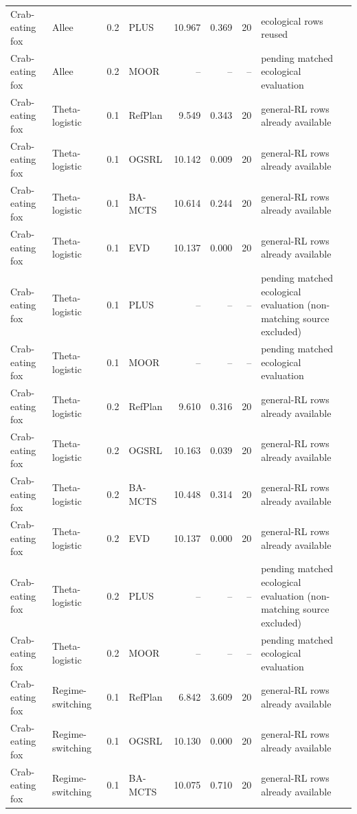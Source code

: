 \documentclass[10pt]{article}
\begin{document}
\begin{landscape}
\begin{center}
\begin{longtable}{@{}llclr rrp{5.2cm}@{}}
Crab-eating fox & Allee & 0.2 & PLUS & 10.967 & 0.369 & 20 & ecological rows reused \\
Crab-eating fox & Allee & 0.2 & MOOR & -- & -- & -- & pending matched ecological evaluation \\
\addlinespace[1.5pt]
Crab-eating fox & Theta-logistic & 0.1 & RefPlan & 9.549 & 0.343 & 20 & general-RL rows already available \\
Crab-eating fox & Theta-logistic & 0.1 & OGSRL & 10.142 & 0.009 & 20 & general-RL rows already available \\
Crab-eating fox & Theta-logistic & 0.1 & BA-MCTS & 10.614 & 0.244 & 20 & general-RL rows already available \\
Crab-eating fox & Theta-logistic & 0.1 & EVD & 10.137 & 0.000 & 20 & general-RL rows already available \\
Crab-eating fox & Theta-logistic & 0.1 & PLUS & -- & -- & -- & pending matched ecological evaluation (non-matching source excluded) \\
Crab-eating fox & Theta-logistic & 0.1 & MOOR & -- & -- & -- & pending matched ecological evaluation \\
\addlinespace[1.5pt]
Crab-eating fox & Theta-logistic & 0.2 & RefPlan & 9.610 & 0.316 & 20 & general-RL rows already available \\
Crab-eating fox & Theta-logistic & 0.2 & OGSRL & 10.163 & 0.039 & 20 & general-RL rows already available \\
Crab-eating fox & Theta-logistic & 0.2 & BA-MCTS & 10.448 & 0.314 & 20 & general-RL rows already available \\
Crab-eating fox & Theta-logistic & 0.2 & EVD & 10.137 & 0.000 & 20 & general-RL rows already available \\
Crab-eating fox & Theta-logistic & 0.2 & PLUS & -- & -- & -- & pending matched ecological evaluation (non-matching source excluded) \\
Crab-eating fox & Theta-logistic & 0.2 & MOOR & -- & -- & -- & pending matched ecological evaluation \\
\addlinespace[1.5pt]
Crab-eating fox & Regime-switching & 0.1 & RefPlan & 6.842 & 3.609 & 20 & general-RL rows already available \\
Crab-eating fox & Regime-switching & 0.1 & OGSRL & 10.130 & 0.000 & 20 & general-RL rows already available \\
Crab-eating fox & Regime-switching & 0.1 & BA-MCTS & 10.075 & 0.710 & 20 & general-RL rows already available \\

\end{longtable}
\end{center}
\end{landscape}
\end{document}
